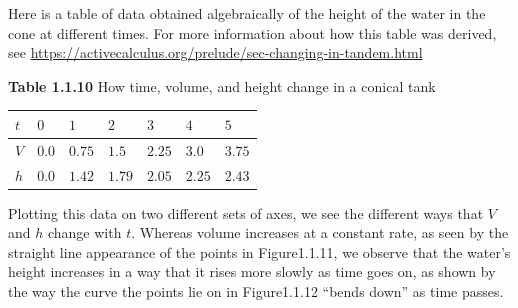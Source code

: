 \documentclass{ximera}
\begin{document}


Here is a table of data obtained algebraically of the height of the water in the cone at different times.  For more information about how this table was derived, see \url{https://activecalculus.org/prelude/sec-changing-in-tandem.html}

\begin{center}
\textbf{Table 1.1.10} How time, volume, and height change in a conical tank

\begin{tabular}{lllllll}
\(t\)&\(0\)&\(1\)&\(2\)&\(3\)&\(4\)&\(5\)\tabularnewline\hline
\(V\)&\(0.0\)&\(0.75\)&\(1.5\)&\(2.25\)&\(3.0\)&\(3.75\)\tabularnewline\hline
\(h\)&\(0.0\)&\(1.42\)&\(1.79\)&\(2.05\)&\(2.25\)&\(2.43\)
\end{tabular}
\end{center}


Plotting this data on two different sets of axes, we see the different ways that \(V\) and \(h\) change with \(t\).  Whereas volume increases at a constant rate, as seen by the straight line appearance of the points in Figure1.1.11, we observe that the water's height increases in a way that it rises more slowly as time goes on, as shown by the way the curve the points lie on in Figure1.1.12 ``bends down'' as time passes. 
\end{document}
